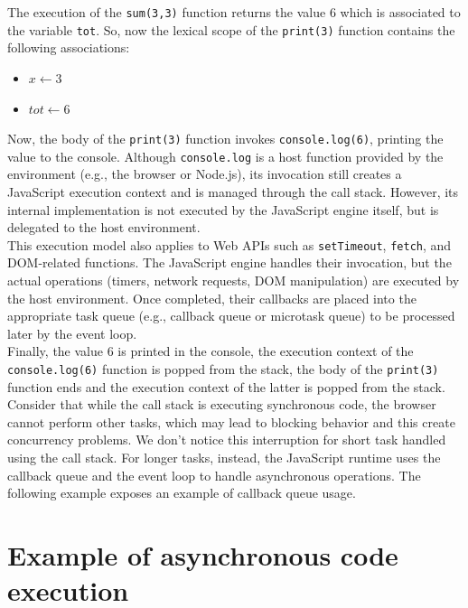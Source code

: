 \documentclass{scrbook}
\begin{document}
The execution of the \texttt{sum(3,3)} function returns the value $6$ which is associated to the variable \texttt{tot}. So, now the lexical scope of the \texttt{print(3)} function contains the following associations:
\begin{itemize}
    \item $x \leftarrow 3$
    \item $tot \leftarrow 6$
\end{itemize}

Now, the body of the \texttt{print(3)} function invokes \texttt{console.log(6)}, printing the value to the console. Although \texttt{console.log} is a host function provided by the environment (e.g., the browser or Node.js), its invocation still creates a JavaScript execution context and is managed through the call stack. However, its internal implementation is not executed by the JavaScript engine itself, but is delegated to the host environment.\\

This execution model also applies to Web APIs such as \texttt{setTimeout}, \texttt{fetch}, and DOM-related functions. The JavaScript engine handles their invocation, but the actual operations (timers, network requests, DOM manipulation) are executed by the host environment. Once completed, their callbacks are placed into the appropriate task queue (e.g., callback queue or microtask queue) to be processed later by the event loop.\\

Finally, the value $6$ is printed in the console, the execution context of the \texttt{console.log(6)} function is popped from the stack, the body of the \texttt{print(3)} function ends and the execution context of the latter is popped from the stack.\\

Consider that while the call stack is executing synchronous code, the browser cannot perform other tasks, which may lead to blocking behavior and this create concurrency problems. We don't notice this interruption for short task handled using the call stack. For longer tasks, instead, the JavaScript runtime uses the callback queue and the event loop to handle asynchronous operations. The following example exposes an example of callback queue usage.

\section{Example of asynchronous code execution}
\end{document}
